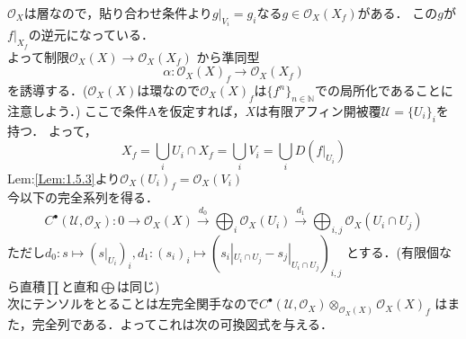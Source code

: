 \documentclass[dvipdfmx,a4paper,11pt]{jsbook}
\begin{document}
{$\mathcal{O}_{X}$は層なので，貼り合わせ条件より$g|_{V_{i}} = g_{i}$なる$g\in \mathcal{O}_{X}(X_{f})$がある．
この$g$が$f|_{X_{f}}$の逆元になっている．\\
よって制限$\mathcal{O}_{X}(X)\to \mathcal{O}_{X}(X_{f})$
から準同型
\begin{equation*}
  \alpha : \mathcal{O}_{X}(X)_{f}\to \mathcal{O}_{X}(X_{f})
\end{equation*}
を誘導する．($\mathcal{O}_{X}(X)$は環なので$\mathcal{O}_{X}(X)_{f}$は$\{f^{n}\}_{n\in \mathbb{N}}$での局所化であることに注意しよう．)
ここで条件Aを仮定すれば，$X$は有限アフィン開被覆$\mathcal{U} = \{U_{i}\}_{i}$を持つ．
よって，
\begin{equation*}
  X_{f} = \bigcup_{i}U_{i}\cap X_{f} = \bigcup_{i}V_{i} = \bigcup_{i}D(f|_{U_{i}})
\end{equation*}
Lem:\ref{Lem:1.5.3}より$\mathcal{O}_{X}(U_{i})_{f} = \mathcal{O}_{X}(V_{i})$\\
今以下の完全系列を得る．
\begin{equation*}
  C^{\bullet}(\mathcal{U},\mathcal{O}_{X}):0 \longrightarrow \mathcal{O}_{X}(X) \stackrel{d_{0}}{\longrightarrow} \bigoplus_{i}\mathcal{O}_{X}(U_{i}) \stackrel{d_{1}}{\longrightarrow} \bigoplus_{i,j}\mathcal{O}_{X}(U_{i} \cap U_{j})
\end{equation*}
ただし$d_{0}:s\mapsto (s|_{U_{i}})_{i},d_{1}:(s_{i})_{i}\mapsto (s_{i}|_{U_{i}\cap U_{j}} - s_{j}|_{U_{i} \cap U_{j}})_{i,j}$
とする．(有限個なら直積$\prod$と直和$\bigoplus$は同じ)\\
次にテンソルをとることは左完全関手なので$C^{\bullet}(\mathcal{U},\mathcal{O}_{X})\otimes_{\mathcal{O}_{X}(X)}\mathcal{O}_{X}(X)_{f}$
はまた，完全列である．よってこれは次の可換図式を与える．

\begin{center}
\end{center}


}
\end{document}
